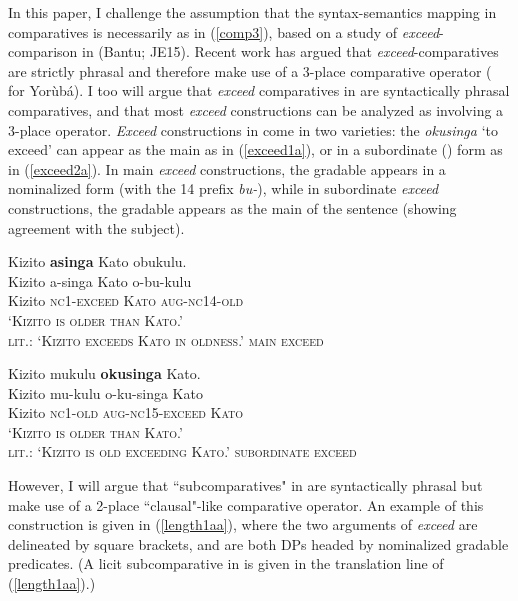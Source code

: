 \documentclass[output=paper,
modfonts
]{langscibook}
\begin{document}
 In this paper, I challenge the assumption that the syntax-semantics mapping in comparatives is necessarily as in (\ref{comp3}), based on a study of {\it exceed}-comparison in  (Bantu; JE15). Recent work has argued that {\it exceed}-comparatives are strictly phrasal and therefore make use of a 3-place comparative operator (\citealt{beck09crosslinguistic, howell12abstracting} for Yor\`ub\'a). I too will argue that {\it exceed} comparatives in  are syntactically phrasal comparatives, and that most {\it exceed} constructions can be analyzed as involving a 3-place operator. {\it Exceed} constructions in  come in two varieties: the  {\it okusinga} `to exceed' can appear as the main  as in (\ref{exceed1a}), or in a subordinate () form as in (\ref{exceed2a}). In main  {\it exceed} constructions, the gradable  appears in a nominalized form (with the  14 prefix {\it bu-}), while in subordinate {\it exceed} constructions, the gradable  appears as the main  of the sentence (showing  agreement with the subject).



\begin{exe}
\ex\label{exceed1a}
\glll  Kizito \textbf{asinga} Kato obukulu. \rm \\
 Kizito a-singa Kato o-bu-kulu \\ 
 Kizito \scshape nc1\rm-exceed Kato \scshape aug-nc14\rm-old \\
 \glt  `Kizito is older than Kato.' \\
lit.: `Kizito exceeds Kato in oldness.' \hfill {\sc main  exceed}

\ex\label{exceed2a}
\glll Kizito mukulu \textbf{okusinga} Kato. \\
Kizito mu-kulu o-ku-singa Kato  \\ 
Kizito \scshape nc1\rm-old \scshape aug-nc15\rm-exceed Kato  \\
\glt `Kizito is older than Kato.' \\
lit.: `Kizito is old exceeding Kato.' \hfill {\sc subordinate exceed}
\end{exe}


However, I will argue that  ``subcomparatives" in  are syntactically phrasal but make use of a 2-place ``clausal"-like comparative operator. An example of this construction is given in (\ref{length1aa}), where the two arguments of {\it exceed} are delineated by square brackets, and are both DPs headed by nominalized gradable predicates. (A licit subcomparative in  is given in the translation line of (\ref{length1aa}).)
\end{document}
